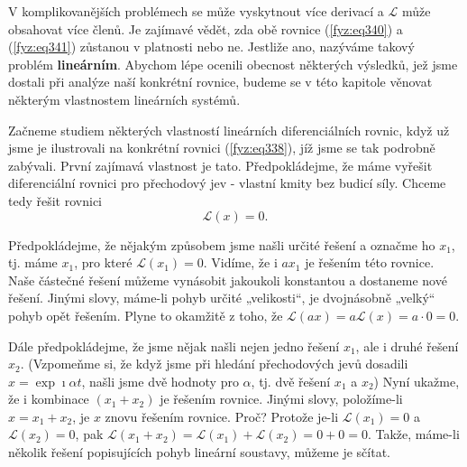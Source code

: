     V komplikovanějších problémech se může vyskytnout více derivací a \(\mathscr{L}\) může obsahovat
    více členů. Je zajímavé vědět, zda obě rovnice (\ref{fyz:eq340}) a (\ref{fyz:eq341}) zůstanou v
    platnosti nebo ne. Jestliže ano, nazýváme takový problém \textbf{lineárním}. Abychom lépe
    ocenili obecnost některých výsledků, jež jsme dostali při analýze naší konkrétní rovnice, budeme
    se v této kapitole věnovat některým vlastnostem lineárních systémů.
    
    Začneme studiem některých vlastností lineárních diferenciálních rovnic, když už jsme je 
    ilustrovali na konkrétní rovnici (\ref{fyz:eq338}), jíž jsme se tak podrobně zabývali. První 
    zajímavá vlastnost je tato. Předpokládejme, že máme vyřešit diferenciální rovnici pro 
    přechodový jev - vlastní kmity bez budicí síly. Chceme tedy řešit rovnici
    \begin{equation}\label{fyz:eq342}
      \mathscr{L}(x) = 0.
    \end{equation}
    
    Předpokládejme, že nějakým způsobem jsme našli určité řešení a označme ho \(x_1\), tj. máme 
    \(x_1\), pro které \(\mathscr{L}(x_1) = 0\). Vidíme, že i \(ax_1\) je řešením této rovnice. 
    Naše částečné řešení můžeme vynásobit jakoukoli konstantou a dostaneme nové řešení. Jinými 
    slovy, máme-li pohyb určité „velikosti“, je dvojnásobně „velký“ pohyb opět řešením. Plyne to 
    okamžitě z toho, že \(\mathscr{L}(ax) = a\mathscr{L}(x) = a \cdot 0 = 0\).
    
    Dále předpokládejme, že jsme nějak našli nejen jedno řešení \(x_1\), ale i druhé řešení \(x_2\).
    (Vzpomeňme si, že když jsme při hledání přechodových jevů dosadili \(x =\exp{\imath\alpha t}\),
    našli jsme dvě hodnoty pro \(\alpha\), tj. dvě řešení \(x_1\) a \(x_2\)) Nyní ukažme, že i
    kombinace \((x_1 + x_2)\) je řešením rovnice. Jinými slovy, položíme-li \(x = x_1 + x_2\), je
    \(x\) znovu řešením rovnice. Proč? Protože je-li \(\mathscr{L}(x_1) = 0\) a \(\mathscr{L}(x_2) =
    0\), pak \(\mathscr{L}(x_1 + x_2) = \mathscr{L}(x_1) + \mathscr{L}(x_2) = 0 + 0 = 0\). Takže,
    máme-li několik řešení popisujících pohyb lineární soustavy, můžeme je sčítat. 
    
